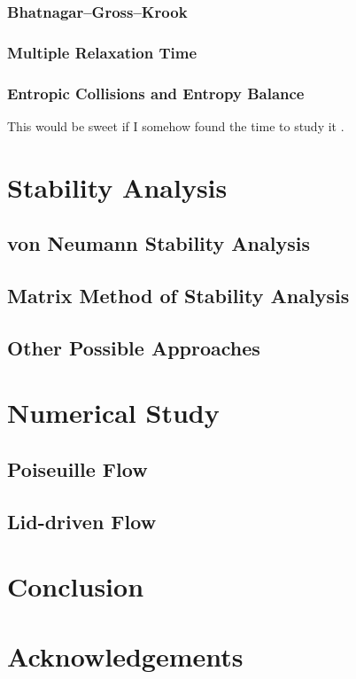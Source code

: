 \documentclass{article}
\begin{document}
\subsubsection{Bhatnagar--Gross--Krook}

\subsubsection{Multiple Relaxation Time}

\subsubsection{Entropic Collisions and Entropy Balance}

{\color{red} This would be sweet if I somehow found the time to study it \cite{gorban2014enhancement}.}

\section{Stability Analysis}

\subsection{von Neumann Stability Analysis}

\subsection{Matrix Method of Stability Analysis}

\subsection{Other Possible Approaches}

\section{Numerical Study}

\subsection{Poiseuille Flow}

\subsection{Lid-driven Flow}

\section{Conclusion}

\section*{Acknowledgements}



	
\end{document}
